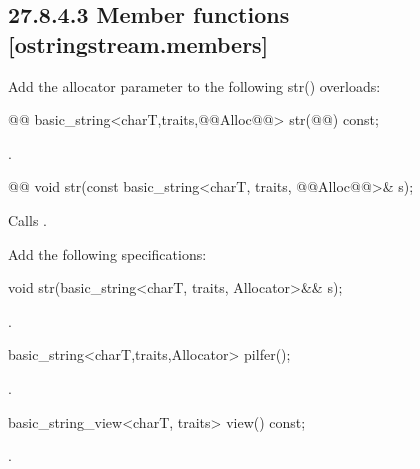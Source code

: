 \documentclass[ebook,11pt,article]{memoir}
\begin{document}
\subsection{27.8.4.3 Member functions [ostringstream.members]}
Add the allocator parameter to the following str() overloads:
\begin{itemdecl}
@@
basic_string<charT,traits,@@Alloc@@> str(@@) const;
\end{itemdecl}
\begin{itemdescr}
\pnum
\returns
{}.
\end{itemdescr}

\begin{itemdecl}
    @@
    void str(const basic_string<charT, traits, @@Alloc@@>& s);
\end{itemdecl}

\begin{itemdescr}
\pnum
\effects
Calls
.
\end{itemdescr}


Add the following specifications:

\begin{addedblock}
\begin{itemdecl}
void str(basic_string<charT, traits, Allocator>&& s);
\end{itemdecl}
\begin{itemdescr}
\pnum
\effects {}.
\end{itemdescr}
\begin{itemdecl}
basic_string<charT,traits,Allocator> pilfer();
\end{itemdecl}
\begin{itemdescr}
\pnum
\returns {}.
\end{itemdescr}
\begin{itemdecl}
basic_string_view<charT, traits> view() const;
\end{itemdecl}
\begin{itemdescr}
\pnum
\returns {}.
\end{itemdescr}
\end{addedblock}


\end{document}
